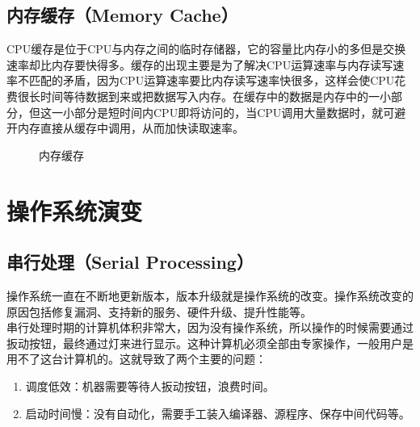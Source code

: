 \vspace{0.5cm}

\subsection{内存缓存（Memory Cache）}

CPU缓存是位于CPU与内存之间的临时存储器，它的容量比内存小的多但是交换速率却比内存要快得多。缓存的出现主要是为了解决CPU运算速率与内存读写速率不匹配的矛盾，因为CPU运算速率要比内存读写速率快很多，这样会使CPU花费很长时间等待数据到来或把数据写入内存。在缓存中的数据是内存中的一小部分，但这一小部分是短时间内CPU即将访问的，当CPU调用大量数据时，就可避开内存直接从缓存中调用，从而加快读取速率。

\begin{figure}[H]
	\centering
	\caption{内存缓存}
\end{figure}

\newpage

\section{操作系统演变}

\subsection{串行处理（Serial Processing）}

操作系统一直在不断地更新版本，版本升级就是操作系统的改变。操作系统改变的原因包括修复漏洞、支持新的服务、硬件升级、提升性能等。\\

串行处理时期的计算机体积非常大，因为没有操作系统，所以操作的时候需要通过扳动按钮，最终通过灯来进行显示。这种计算机必须全部由专家操作，一般用户是用不了这台计算机的。这就导致了两个主要的问题：

\begin{enumerate}
	\item 调度低效：机器需要等待人扳动按钮，浪费时间。
	\item 启动时间慢：没有自动化，需要手工装入编译器、源程序、保存中间代码等。
\end{enumerate}


